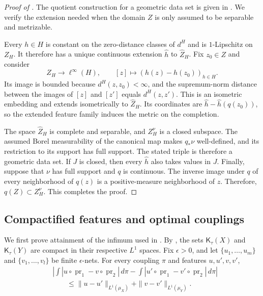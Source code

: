 \documentclass[11pt]{amsart}
\theoremstyle{plain}
\theoremstyle{definition}
\theoremstyle{remark}
\newcommand{\Kc}{\mathsf K}
\DeclareMathOperator{\pr}{pr}
\begin{document}
\begin{proof}[Proof of ]
The quotient construction for a geometric data set is given in \cite[Definition~3.16, Proposition~3.17, Claim~3.18, and Proposition~3.19]{gds1}. We verify the extension needed when the domain $Z$ is only assumed to be separable and metrizable.

Every $h\in H$ is constant on the zero-distance classes of $d^H$ and is $1$-Lipschitz on $Z_H$. It therefore has a unique continuous extension $\widehat h$ to $\widehat Z_H$. Fix $z_0\in Z$ and consider
\[
Z_H\longrightarrow\ell^\infty(H),\qquad
[z]\longmapsto(h(z)-h(z_0))_{h\in H}.
\]
Its image is bounded because $d^H(z,z_0)<\infty$, and the supremum-norm distance between the images of $[z]$ and $[z']$ equals $d^H(z,z')$. This is an isometric embedding and extends isometrically to $\widehat Z_H$. Its coordinates are $\widehat h-\widehat h(q(z_0))$, so the extended feature family induces the metric on the completion.

The space $\widehat Z_H$ is complete and separable, and $Z_H^\nu$ is a closed subspace. The assumed Borel measurability of the canonical map makes $q_*\nu$ well-defined, and its restriction to its support has full support. The stated triple is therefore a geometric data set. If $J$ is closed, then every $\widehat h$ also takes values in $J$. Finally, suppose that $\nu$ has full support and $q$ is continuous. The inverse image under $q$ of every neighborhood of $q(z)$ is a positive-measure neighborhood of $z$. Therefore, $q(Z)\subset Z_H^\nu$. This completes the proof.
\end{proof}

\subsection{Compactified features and optimal couplings}
\label{subsec:app-feature-coupling}

We first prove attainment of the infimum used in . By , the sets $\Kc_\tau(X)$ and $\Kc_\tau(Y)$ are compact in their respective $L^1$ spaces. Fix $\epsilon>0$, and let $\{u_1,\ldots,u_m\}$ and $\{v_1,\ldots,v_l\}$ be finite $\epsilon$-nets. For every coupling $\pi$ and features $u,u',v,v'$,
\[
\begin{aligned}
&\left|\int|u\circ\pr_1-v\circ\pr_2|\,d\pi
-\int|u'\circ\pr_1-v'\circ\pr_2|\,d\pi\right|\\
&\qquad\leq
\|u-u'\|_{L^1(\mu_X)}+\|v-v'\|_{L^1(\mu_Y)}.
\end{aligned}
\]
\end{document}
